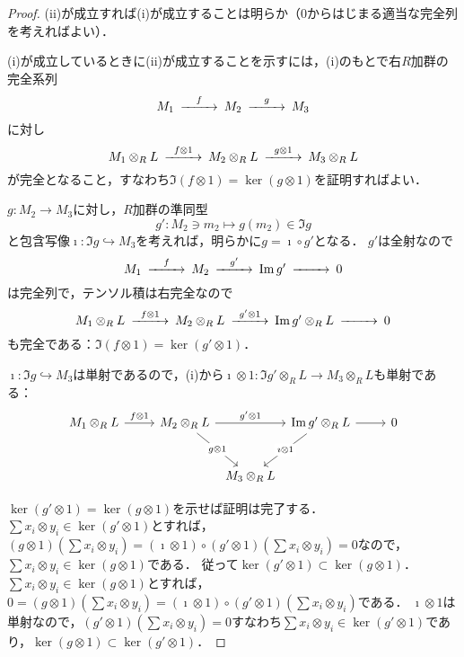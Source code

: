 \begin{proof}
  (ii)が成立すれば(i)が成立することは明らか（$0$からはじまる適当な完全列を考えればよい）．

  (i)が成立しているときに(ii)が成立することを示すには，(i)のもとで右$R$加群の完全系列
  \[
  \begin{CD}
    M_1 @>{f}>> M_2 @>{g}>> M_3
  \end{CD}
  \]
  に対し
  \[
  \begin{CD}
    M_1 \otimes_R L @>{f \otimes 1}>> M_2 \otimes_R L @>{g \otimes 1}>> M_3 \otimes_R L
  \end{CD}
  \]
  が完全となること，すなわち$\Im(f \otimes 1) = \ker (g \otimes 1)$を証明すればよい．

  $g \colon M_2 \to M_3$に対し，$R$加群の準同型
  \[ g' \colon M_2 \ni m_2 \mapsto g(m_2) \in \Im g \]
  と包含写像$\imath \colon \Im g \hookrightarrow M_3$を考えれば，明らかに$g = \imath \circ g'$となる．
  $g'$は全射なので
  \[
  \begin{CD}
    M_1 @>{f}>> M_2 @>{g'}>> \Im g' @>>> 0
  \end{CD}
  \]
  は完全列で，テンソル積は右完全なので
  \[
  \begin{CD}
    M_1 \otimes_R L @>{f \otimes 1}>> M_2 \otimes_R L @>{g' \otimes 1}>> \Im g' \otimes_R L @>>> 0
  \end{CD}
  \]
  も完全である：$\Im(f \otimes 1) = \ker (g' \otimes 1)$．

  $\imath \colon \Im g \hookrightarrow M_3$は単射であるので，(i)から$\imath \otimes 1 \colon \Im g' \otimes_R L \to M_3 \otimes_R L$も単射である：
  \[
  \begin{tikzcd}
    M_1 \otimes_R L \arrow[r, "f \otimes 1"] & M_2 \otimes_R L \arrow[rr, "g' \otimes 1"]\arrow[rd, "g \otimes 1" description] &[-20pt]&[-20pt] \Im g' \otimes_R L \arrow[r]\arrow[ld, "\imath \otimes 1" description] & 0 \\[8pt]
    & & M_3 \otimes_R L
  \end{tikzcd}
  \]

  $\ker (g' \otimes 1) = \ker (g \otimes 1)$を示せば証明は完了する．
  $\sum x_i \otimes y_i \in \ker (g'\otimes 1)$とすれば，$(g \otimes 1)(\sum x_i \otimes y_i) = (\imath \otimes 1) \circ (g' \otimes 1)(\sum x_i \otimes y_i) = 0$なので，$\sum x_i \otimes y_i \in \ker(g \otimes 1)$である．
  従って$\ker (g' \otimes 1) \subset \ker (g \otimes 1)$．
  $\sum x_i \otimes y_i \in \ker (g\otimes 1)$とすれば，$0 = (g \otimes 1)(\sum x_i \otimes y_i) = (\imath \otimes 1) \circ (g' \otimes 1)(\sum x_i \otimes y_i)$である．
  $\imath \otimes 1$は単射なので，$(g' \otimes 1)(\sum x_i \otimes y_i) = 0$すなわち$\sum x_i \otimes y_i \in \ker(g' \otimes 1)$であり，$\ker (g \otimes 1) \subset \ker (g' \otimes 1)$．
\end{proof}

